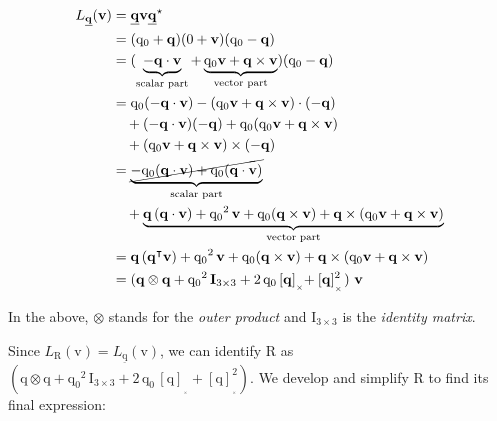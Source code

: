 \begin{align*}
    L_{\underline{\bm{\mathrm{q}}}}(\bm{\mathrm{v}}) &= \underline{\bm{\mathrm{q}}}\bm{\mathrm{v}}\underline{\bm{\mathrm{q}}}^\star \\
    &= (\mathrm{q}_0+\bm{\mathrm{q}})(0+\bm{\mathrm{v}})(\mathrm{q}_0-\bm{\mathrm{q}}) \\
    &= (\underbrace{-\bm{\mathrm{q}}\cdot\bm{\mathrm{v}}}_{\text{scalar part}} + \underbrace{\mathrm{q}_0\bm{\mathrm{v}}+\bm{\mathrm{q}}\times\bm{\mathrm{v}}}_{\text{vector part}})(\mathrm{q}_0-\bm{\mathrm{q}}) \\
    &= \mathrm{q}_0(-\bm{\mathrm{q}}\cdot\bm{\mathrm{v}}) - (\mathrm{q}_0\bm{\mathrm{v}}+\bm{\mathrm{q}}\times\bm{\mathrm{v}})\cdot(-\bm{\mathrm{q}}) \\
    &\quad + (-\bm{\mathrm{q}}\cdot\bm{\mathrm{v}})(-\bm{\mathrm{q}}) + \mathrm{q}_0(\mathrm{q}_0\bm{\mathrm{v}}+\bm{\mathrm{q}}\times\bm{\mathrm{v}}) \\
    &\quad + (\mathrm{q}_0\bm{\mathrm{v}}+\bm{\mathrm{q}}\times\bm{\mathrm{v}})\times(-\bm{\mathrm{q}}) \\
    &= \underbrace{\cancel{-\mathrm{q}_0(\bm{\mathrm{q}}\cdot\bm{\mathrm{v}}) + \mathrm{q}_0(\bm{\mathrm{q}}\cdot\bm{\mathrm{v}})}}_{\text{scalar part}} \\
    &\quad + \underbrace{\bm{\mathrm{q}}\,(\bm{\mathrm{q}}\cdot\bm{\mathrm{v}}) + {\mathrm{q}_0}^2\,\bm{\mathrm{v}} + \mathrm{q}_0(\bm{\mathrm{q}}\times\bm{\mathrm{v}}) + \bm{\mathrm{q}}\times(\mathrm{q}_0\bm{\mathrm{v}}+\bm{\mathrm{q}}\times\bm{\mathrm{v}})}_{\text{vector part}} \\
    &= \bm{\mathrm{q}}\,(\bm{\mathrm{q}}^\intercal\bm{\mathrm{v}}) + {\mathrm{q}_0}^2\,\bm{\mathrm{v}} + \mathrm{q}_0(\bm{\mathrm{q}}\times\bm{\mathrm{v}}) + \bm{\mathrm{q}}\times(\mathrm{q}_0\bm{\mathrm{v}}+\bm{\mathrm{q}}\times\bm{\mathrm{v}}) \\
    &= (\bm{\mathrm{q}}\otimes\bm{\mathrm{q}} + {\mathrm{q}_0}^2\,\bm{\mathrm{I}}_{3\times3} + 2\,\mathrm{q}_0\,[\bm{\mathrm{q}}]_{_{_\times}}\!\! + [\bm{\mathrm{q}}]_{_{_\times}}^2)\,\,\bm{\mathrm{v}}
\end{align*}

\noindent In the above, $\otimes$ stands for the \textit{outer product} and $\bm{\mathrm{I}}_{3\times3}$ is the \textit{identity matrix}. 

\noindent Since $L_{\bm{\mathrm{R}}}(\bm{\mathrm{v}}) = L_{\underline{\bm{\mathrm{q}}}}(\bm{\mathrm{v}})$, we can identify $\bm{\mathrm{R}}$ as  $(\bm{\mathrm{q}}\otimes\bm{\mathrm{q}} + {\mathrm{q}_0}^2\,\bm{\mathrm{I}}_{3\times3} + 2\,\mathrm{q}_0\,[\bm{\mathrm{q}}]_{_{_\times}}\!\! + [\bm{\mathrm{q}}]_{_{_\times}}^2)$. We develop and simplify $\bm{\mathrm{R}}$ to find its final expression:


